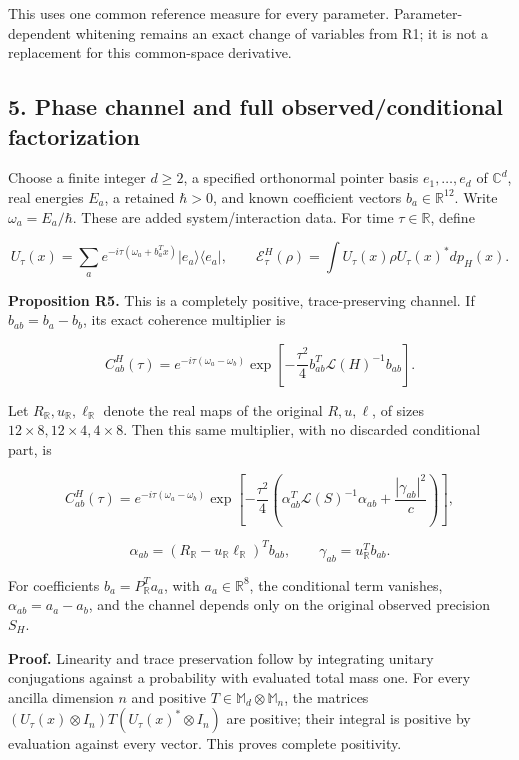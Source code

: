\documentclass[
  11pt,
]{article}
\begin{document}
This uses one common reference measure for every parameter.
Parameter-dependent whitening remains an exact change of variables from
R1; it is not a replacement for this common-space derivative.

\subsection{5. Phase channel and full observed/conditional
factorization}\label{phase-channel-and-full-observedconditional-factorization}

Choose a finite integer \(d\ge2\), a specified orthonormal pointer basis
\(e_1,\ldots,e_d\) of \(\mathbb C^d\), real energies \(E_a\), a retained
\(\hbar>0\), and known coefficient vectors \(b_a\in\mathbb R^{12}\).
Write \(\omega_a=E_a/\hbar\). These are added system/interaction data.
For time \(\tau\in\mathbb R\), define

\[
U_\tau(x)=\sum_a e^{-i\tau(\omega_a+b_a^Tx)}|e_a\rangle\langle e_a|,
\qquad \mathcal E^H_\tau(\rho)=\int U_\tau(x)\rho U_\tau(x)^*dp_H(x).
\]

\textbf{Proposition R5.} This is a completely positive, trace-preserving
channel. If \(b_{ab}=b_a-b_b\), its exact coherence multiplier is

\[
C^H_{ab}(\tau)=e^{-i\tau(\omega_a-\omega_b)}
\exp\!\left[-\frac{\tau^2}{4}b_{ab}^T\mathscr L(H)^{-1}b_{ab}\right].
\]

Let \(R_{\mathbb R},u_{\mathbb R},\ell_{\mathbb R}\) denote the real
maps of the original \(R,u,\ell\), of sizes
\(12\times8,12\times4,4\times8\). Then this same multiplier, with no
discarded conditional part, is

\[
C^H_{ab}(\tau)=e^{-i\tau(\omega_a-\omega_b)}
\exp\!\left[-\frac{\tau^2}{4}
\left(\alpha_{ab}^T\mathscr L(S)^{-1}\alpha_{ab}
+\frac{|\gamma_{ab}|^2}{c}\right)\right],
\]

\[
\alpha_{ab}=(R_{\mathbb R}-u_{\mathbb R}\ell_{\mathbb R})^Tb_{ab},
\qquad \gamma_{ab}=u_{\mathbb R}^Tb_{ab}.
\]

For coefficients \(b_a=P_{\mathbb R}^Ta_a\), with \(a_a\in\mathbb R^8\),
the conditional term vanishes, \(\alpha_{ab}=a_a-a_b\), and the channel
depends only on the original observed precision \(S_H\).

\textbf{Proof.} Linearity and trace preservation follow by integrating
unitary conjugations against a probability with evaluated total mass
one. For every ancilla dimension \(n\) and positive
\(T\in\mathbb M_d\otimes\mathbb M_n\), the matrices
\((U_\tau(x)\otimes I_n)T(U_\tau(x)^*\otimes I_n)\) are positive; their
integral is positive by evaluation against every vector. This proves
complete positivity.
\end{document}
